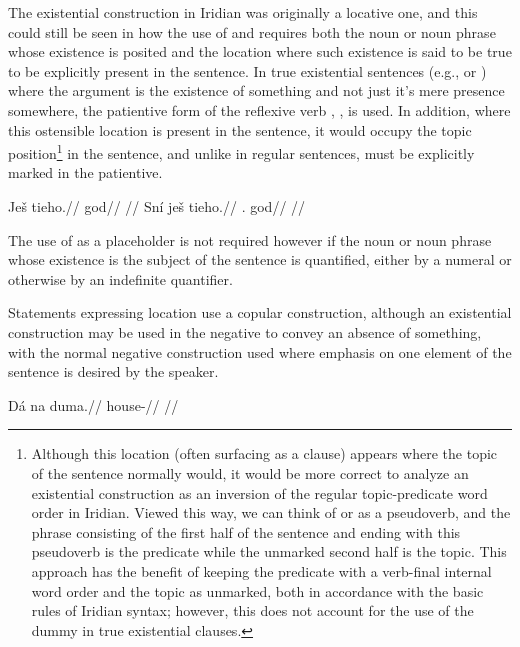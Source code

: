 The existential construction in Iridian was originally a
locative one, and this could still be seen in how the use of
 and  requires both the noun or noun phrase whose existence
is posited and the location where such existence is said to be true to be
explicitly present in the sentence. In true existential sentences (e.g.,
 or ) where the argument is the
existence of something and not just it's mere presence somewhere, the patientive
form of the reflexive verb , , is used. In addition, where this
ostensible location is present in the sentence, it would occupy the
topic position\footnote{Although this location (often surfacing as
a  clause) appears where the topic of the sentence normally would, it
would be more correct to analyze an existential construction as an inversion of
the regular topic-predicate word order in Iridian. Viewed this way, we can think
of  or  as a pseudoverb, and the phrase consisting of the
first half of the sentence and ending with this pseudoverb is the predicate
while the unmarked second half is the topic. This approach has the benefit of
keeping the predicate with a verb-final internal word order and the topic as
unmarked, both in accordance with the basic rules of Iridian syntax; however,
this does not account for the use of the dummy  in true existential
clauses.} in the sentence, and unlike in regular sentences, must be explicitly
marked in the patientive.


\begin{multicols}{2}
\pex
\a\begingl
\gla \ljudge{*}Ješ tieho.//
\glb \Exst{} god//
\glft {}//
\endgl
\a\begingl
\gla Sní ješ tieho.//
\glb \Refl{}.\Acc{} \Exst{} god//
\glft {}//
\endgl
\xe
\end{multicols}

The use of  as a placeholder is not required however if the noun or
noun phrase whose existence is the subject of the sentence is quantified, either
by a numeral or otherwise by an indefinite quantifier.

Statements expressing location use a copular construction, although an
existential construction may be used in the negative to convey an absence of
something, with the normal negative construction used where emphasis on one
element of the sentence is desired by the speaker.

\pex
\begingl
\gla Dá na duma.//
\glb {} \Loc{} house-\Acc{}//
\glft {}//
\endgl
\xe

